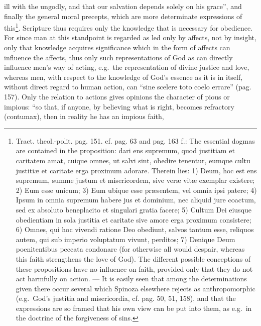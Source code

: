 \documentclass[12pt,a4paper,openany]{book}
\newcommand{\opage}[1]{\marginnote{\footnotesize\textit{[#1]}}}
\begin{document}
\opage{156}\setcounter{footnote}{0}ill with the ungodly, and that our salvation depends solely on his grace'', and finally the general moral precepts, which are more determinate expressions of this\footnote{Tract. theol.-polit. pag. 151. cf. pag. 63 and pag. 163 f.: The essential dogmas are contained in the proposition: dari ens supremum, quod justitiam et caritatem amat, cuique omnes, ut salvi sint, obedire tenentur, eumque cultu justitiæ et caritate erga proximum adorare. Therein lies: 1) Deum, hoc est ens supremum, summe justum et misericordem, sive veræ vitæ exemplar existere; 2) Eum esse unicum; 3) Eum ubique esse præsentem, vel omnia ipsi patere; 4) Ipsum in omnia supremum habere jus et dominium, nec aliquid jure coactum, sed ex absoluto beneplacito et singulari gratia facere; 5) Cultum Dei eiusque obedientiam in sola justitia et caritate sive amore erga proximum consistere; 6) Omnes, qui hoc vivendi ratione Deo obediunt, salvos tantum esse, reliquos autem, qui sub imperio voluptatum vivunt, perditos; 7) Denique Deum poenitentibus peccata condonare (for otherwise all would despair, whereas this faith strengthens the love of God). The different possible conceptions of these propositions have no influence on faith, provided only that they do not act harmfully on action. --- It is easily seen that among the determinations given there occur several which Spinoza elsewhere rejects as anthropomorphic (e.g.\ God's justitia and misericordia, cf. pag. 50, 51, 158), and that the expressions are so framed that his own view can be put into them, as e.g.\ in the doctrine of the forgiveness of sins.}. Scripture thus requires only the knowledge that is necessary for obedience. For since man at this standpoint is regarded as led only by affects, not by insight, only that knowledge acquires significance which in the form of affects can influence the affects, thus only such representations of God as can directly influence men's way of acting, e.g.\ the representation of divine justice and love, whereas men, with respect to the knowledge of God's essence as it is in itself, without direct regard to human action, can ``sine scelere toto coelo errare'' (pag. 157). Only the relation to actions gives opinions the character of pious or impious: ``so that, if anyone, by believing what is right, becomes refractory (contumax), then in reality he has an impious faith,
\end{document}
